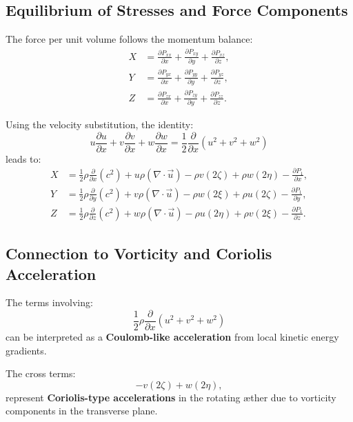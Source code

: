 \documentclass[a4paper,12pt]{article}
\begin{document}
    \subsection{Equilibrium of Stresses and Force Components}
    The force per unit volume follows the momentum balance:
    \begin{align}
        X &= \frac{\partial P_{xx}}{\partial x} + \frac{\partial P_{xy}}{\partial y} + \frac{\partial P_{xz}}{\partial z}, \\
        Y &= \frac{\partial P_{yx}}{\partial x} + \frac{\partial P_{yy}}{\partial y} + \frac{\partial P_{yz}}{\partial z}, \\
        Z &= \frac{\partial P_{zx}}{\partial x} + \frac{\partial P_{zy}}{\partial y} + \frac{\partial P_{zz}}{\partial z}.
    \end{align}

    Using the velocity substitution, the identity:
    \[
        u \frac{\partial u}{\partial x} + v \frac{\partial v}{\partial x} + w \frac{\partial w}{\partial x} = \frac{1}{2} \frac{\partial}{\partial x}(u^2 + v^2 + w^2)
    \]
    leads to:
    \begin{align}
        X &= \frac{1}{2} \rho \frac{\partial}{\partial x}(c^2)
        + u \rho (\nabla \cdot \vec{u})
        - \rho v (2 \zeta) + \rho w (2 \eta)
        - \frac{\partial P_1}{\partial x}, \\
        Y &= \frac{1}{2} \rho \frac{\partial}{\partial y}(c^2)
        + v \rho (\nabla \cdot \vec{u})
        - \rho w (2 \xi) + \rho u (2 \zeta)
        - \frac{\partial P_1}{\partial y}, \\
        Z &= \frac{1}{2} \rho \frac{\partial}{\partial z}(c^2)
        + w \rho (\nabla \cdot \vec{u})
        - \rho u (2 \eta) + \rho v (2 \xi)
        - \frac{\partial P_1}{\partial z}.
    \end{align}

    \subsection{Connection to Vorticity and Coriolis Acceleration}
    The terms involving:
    \begin{equation}
        \frac{1}{2} \rho \frac{\partial}{\partial x} (u^2 + v^2 + w^2)
    \end{equation}
    can be interpreted as a \textbf{Coulomb-like acceleration} from local kinetic energy gradients.

    The cross terms:
    \begin{equation}
        - v (2 \zeta) + w (2 \eta),
    \end{equation}
    represent \textbf{Coriolis-type accelerations} in the rotating æther due to vorticity components in the transverse plane.
\end{document}
